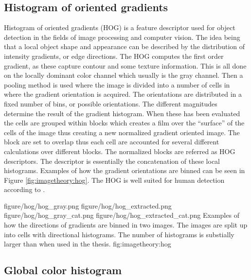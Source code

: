 \subsection{Histogram of oriented gradients}
\label{sec:hog_feature}
Histogram of oriented gradients (HOG) is a feature descriptor used for object detection in the fields of image processing and computer vision. The idea being that a local object shape and appearance can be described by the distribution of intensity gradients, or edge directions. The HOG computes the first order gradient, as these capture contour and some texture information. This is all done on the locally dominant color channel which usually is the gray channel. Then a pooling method is used where the image is divided into a number of cells in where the gradient orientation is acquired. The orientations are distributed in a fixed number of bins, or possible orientations. The different magnitudes determine the result of the gradient histogram. When these has been evaluated the cells are grouped within blocks which creates a film over the ``surface'' of the cells of the image thus creating a new normalized gradient oriented image. The block are set to overlap thus each cell are accounted for several different calculations over different blocks. The normalized blocks are referred as HOG descriptors. The descriptor is essentially the concatenation of these local histograms. Examples of how the gradient orientations are binned can be seen in Figure \ref{fig:imagetheory:hog}. The HOG is well suited for human detection according to \cite{dalal2005histograms}. 

\fourfigure
{figure/hog/hog_gray.png}
{figure/hog/hog_extracted.png}
{figure/hog/hog_gray_cat.png}
{figure/hog/hog_extracted_cat.png}
{Examples of how the directions of gradients are binned in two images. The images are split up into cells with directional histograms. The number of histograms is substially larger than when used in the thesis.}
{fig:imagetheory:hog} 

\subsection{Global color histogram}
\label{sec:gch_feature}

